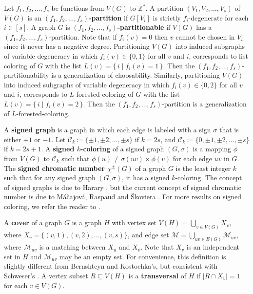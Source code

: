 \documentclass{article}
\theoremstyle{definition}
\begin{document}
Let $f_{1}, f_{2}, \dots, f_{s}$ be functions from $V(G)$ to $\mathbb{Z}^{*}$. A partition $(V_{1}, V_{2}, \dots, V_{s})$ of $V(G)$ is an \textbf{$(f_{1}, f_{2}, \dots, f_{s})$-partition} if $G[V_{i}]$ is strictly $f_{i}$-degenerate for each $i \in [s]$. A graph $G$ is \textbf{$(f_{1}, f_{2}, \dots, f_{s})$-partitionable} if $V(G)$ has a $(f_{1}, f_{2}, \dots, f_{s})$-partition. Note that if $f_{i}(v) = 0$ then $v$ cannot be chosen in $V_{i}$ since it never has a negative degree. Partitioning $V(G)$ into induced subgraphs of variable degeneracy in which $f_{i}(v) \in \{0, 1\}$ for all $v$ and $i$, corresponds to list coloring of $G$ with the list $L(v) = \{\,i \mid f_{i}(v) = 1\,\}$. Then the $(f_{1}, f_{2}, \dots, f_{s})$-partitionability is a generalization of choosability. Similarly, partitioning $V(G)$ into induced subgraphs of variable degeneracy in which $f_{i}(v) \in \{0, 2\}$ for all $v$ and $i$, corresponds to $L$-forested-coloring of $G$ with the list $L(v) = \{\,i \mid f_{i}(v) = 2\,\}$. Then the $(f_{1}, f_{2}, \dots, f_{s})$-partition is a generalization of $L$-forested-coloring. 

A \textbf{signed graph} is a graph in which each edge is labeled with a sign $\sigma$ that is either $+1$ or $-1$. Let $\mathcal{C}_{k} \coloneqq \{\pm 1, \pm 2, \dots, \pm s\}$ if $k = 2s$, and $\mathcal{C}_{k} \coloneqq \{0, \pm 1, \pm 2, \dots, \pm s\}$ if $k = 2s+1$. A \textbf{signed $k$-coloring} of a signed graph $(G, \sigma)$ is a mapping $\phi$ from $V(G)$ to $\mathcal{C}_{k}$ such that $\phi(u) \neq \sigma(uv) \times \phi(v)$ for each edge $uv$ in $G$. The \textbf{signed chromatic number $\chi^{\pm}(G)$} of a graph $G$ is the least integer $k$ such that for any signed graph $(G, \sigma)$, it has a signed $k$-coloring. The concept of signed graphs is due to Harary \cite{MR0067468}, but the current concept of signed chromatic number is due to M\'{a}\v{c}ajov\'{a}, Raspaud and \v{S}koviera \cite{MR3484719}. For more results on signed coloring, we refer the reader to \cite{MR3612419, MR3425977, MR3477382}. 

A \textbf{cover} of a graph $G$ is a graph $H$ with vertex set $V(H) = \bigcup_{v \in V(G)} X_{v}$, where $X_{v} = \{(v, 1), (v, 2), \dots, (v, s)\}$, and edge set $\mathscr{M} = \bigcup_{uv \in E(G)}\mathscr{M}_{uv}$, where $\mathscr{M}_{uv}$ is a matching between $X_{u}$ and $X_{v}$. Note that $X_{v}$ is an independent set in $H$ and $\mathscr{M}_{uv}$ may be an empty set. For convenience, this definition is slightly different from Bernshteyn and Kostochka's, but consistent with Schweser's \cite{MR4020554}. A vertex subset $R \subseteq V(H)$ is a \textbf{transversal} of $H$ if $|R \cap X_{v}| = 1$ for each $v \in V(G)$. 
\end{document}
